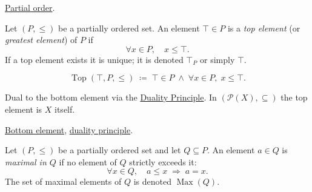 \begin{remark*}[Dependencies]
\hyperref[def:partial-order]{Partial order}.
\end{remark*}


\begin{tcolorbox}[colback=defbox, colframe=defborder, arc=2pt,
  left=6pt, right=6pt, top=4pt, bottom=4pt,
  title={\small\textbf{Definition (Top Element)}},
  fonttitle=\small\bfseries]
\begin{definition}
\label{def:top-element}
Let $(P, \leq)$ be a partially ordered set.  An element $\top \in P$ is
a \emph{top element} (or \emph{greatest element}) of $P$ if
\[
\forall x \in P, \quad x \leq \top.
\]
If a top element exists it is unique; it is denoted $\top_P$ or simply
$\top$.
\end{definition}
\end{tcolorbox}

\begin{remark*}
\[
\operatorname{Top}(\top, P, \leq)
\;\coloneqq\;
\top \in P \;\land\; \forall x \in P,\; x \leq \top.
\]
\end{remark*}

\begin{remark*}[Interpretation]
Dual to the bottom element via the
\hyperref[prop:duality-principle]{Duality Principle}.
In $(\mathcal{P}(X), \subseteq)$ the top element is $X$ itself.
\end{remark*}

\begin{remark*}[Dependencies]
\hyperref[def:bottom-element]{Bottom element},
\hyperref[prop:duality-principle]{duality principle}.
\end{remark*}


\begin{definition}
\label{def:maximal-element}
Let $(P, \leq)$ be a partially ordered set and let $Q \subseteq P$.  An
element $a \in Q$ is \emph{maximal in $Q$} if no element of $Q$ strictly
exceeds it:
\[
\forall x \in Q, \quad a \leq x \;\Longrightarrow\; a = x.
\]
The set of maximal elements of $Q$ is denoted $\operatorname{Max}(Q)$.
\end{definition}

